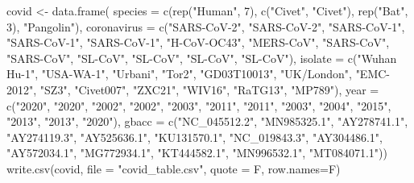 \documentclass[
]{book}
\newenvironment{Shaded}{\begin{snugshade}}{\end{snugshade}}
\newcommand{\AttributeTok}[1]{\textcolor[rgb]{0.77,0.63,0.00}{#1}}
\newcommand{\DecValTok}[1]{\textcolor[rgb]{0.00,0.00,0.81}{#1}}
\newcommand{\FunctionTok}[1]{\textcolor[rgb]{0.00,0.00,0.00}{#1}}
\newcommand{\NormalTok}[1]{#1}
\newcommand{\OtherTok}[1]{\textcolor[rgb]{0.56,0.35,0.01}{#1}}
\newcommand{\StringTok}[1]{\textcolor[rgb]{0.31,0.60,0.02}{#1}}
\begin{document}
\begin{Shaded}
\begin{Highlighting}[]
\NormalTok{covid }\OtherTok{\textless{}{-}} \FunctionTok{data.frame}\NormalTok{(}
\AttributeTok{species =} \FunctionTok{c}\NormalTok{(}\FunctionTok{rep}\NormalTok{(}\StringTok{"Human"}\NormalTok{, }\DecValTok{7}\NormalTok{), }\FunctionTok{c}\NormalTok{(}\StringTok{"Civet"}\NormalTok{, }\StringTok{"Civet"}\NormalTok{), }\FunctionTok{rep}\NormalTok{(}\StringTok{"Bat"}\NormalTok{, }\DecValTok{3}\NormalTok{), }\StringTok{"Pangolin"}\NormalTok{),}
\AttributeTok{coronavirus =} \FunctionTok{c}\NormalTok{(}\StringTok{"SARS{-}CoV{-}2"}\NormalTok{, }\StringTok{"SARS{-}CoV{-}2"}\NormalTok{, }\StringTok{"SARS{-}CoV{-}1"}\NormalTok{, }\StringTok{"SARS{-}CoV{-}1"}\NormalTok{, }\StringTok{"SARS{-}CoV{-}1"}\NormalTok{, }\StringTok{"H{-}CoV{-}OC43"}\NormalTok{, }\StringTok{"MERS{-}CoV"}\NormalTok{, }\StringTok{"SARS{-}CoV"}\NormalTok{, }\StringTok{"SARS{-}CoV"}\NormalTok{, }\StringTok{"SL{-}CoV"}\NormalTok{, }\StringTok{"SL{-}CoV"}\NormalTok{, }\StringTok{"SL{-}CoV"}\NormalTok{, }\StringTok{"SL{-}CoV"}\NormalTok{),}
\AttributeTok{isolate =} \FunctionTok{c}\NormalTok{(}\StringTok{"Wuhan Hu{-}1"}\NormalTok{, }\StringTok{"USA{-}WA{-}1"}\NormalTok{, }\StringTok{"Urbani"}\NormalTok{, }\StringTok{"Tor2"}\NormalTok{, }\StringTok{"GD03T10013"}\NormalTok{, }\StringTok{"UK/London"}\NormalTok{,  }\StringTok{"EMC{-}2012"}\NormalTok{, }\StringTok{"SZ3"}\NormalTok{, }\StringTok{"Civet007"}\NormalTok{, }\StringTok{"ZXC21"}\NormalTok{, }\StringTok{"WIV16"}\NormalTok{, }\StringTok{"RaTG13"}\NormalTok{, }\StringTok{"MP789"}\NormalTok{),}
\AttributeTok{year =} \FunctionTok{c}\NormalTok{(}\StringTok{"2020"}\NormalTok{, }\StringTok{"2020"}\NormalTok{, }\StringTok{"2002"}\NormalTok{, }\StringTok{"2002"}\NormalTok{, }\StringTok{"2003"}\NormalTok{, }\StringTok{"2011"}\NormalTok{, }\StringTok{"2011"}\NormalTok{, }\StringTok{"2003"}\NormalTok{, }\StringTok{"2004"}\NormalTok{, }\StringTok{"2015"}\NormalTok{, }\StringTok{"2013"}\NormalTok{, }\StringTok{"2013"}\NormalTok{, }\StringTok{"2020"}\NormalTok{),}
\AttributeTok{gbacc =} \FunctionTok{c}\NormalTok{(}\StringTok{"NC\_045512.2"}\NormalTok{, }\StringTok{"MN985325.1"}\NormalTok{, }\StringTok{"AY278741.1"}\NormalTok{, }\StringTok{"AY274119.3"}\NormalTok{, }\StringTok{"AY525636.1"}\NormalTok{, }\StringTok{"KU131570.1"}\NormalTok{, }\StringTok{"NC\_019843.3"}\NormalTok{, }\StringTok{"AY304486.1"}\NormalTok{, }\StringTok{"AY572034.1"}\NormalTok{, }\StringTok{"MG772934.1"}\NormalTok{, }\StringTok{"KT444582.1"}\NormalTok{, }\StringTok{"MN996532.1"}\NormalTok{, }\StringTok{"MT084071.1"}\NormalTok{))}
\FunctionTok{write.csv}\NormalTok{(covid, }\AttributeTok{file =} \StringTok{"covid\_table.csv"}\NormalTok{, }\AttributeTok{quote =}\NormalTok{ F, }\AttributeTok{row.names=}\NormalTok{F)}



\end{Highlighting}
\end{Shaded}
\end{document}
